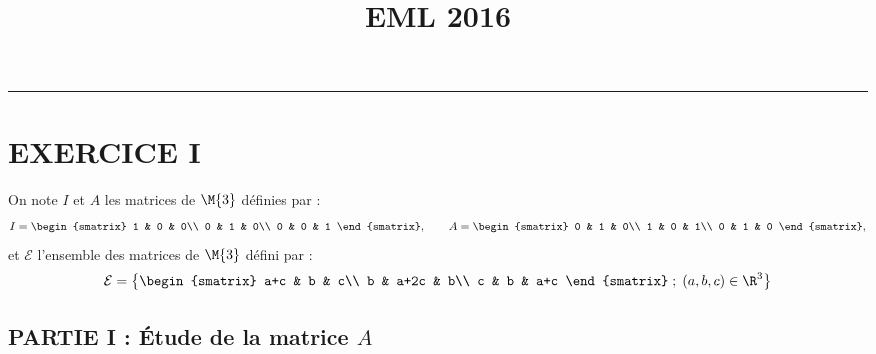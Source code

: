 \documentclass[11pt]{article}%
\title{\bf \vspace{-1.6cm} EML 2016} %
\author{} %
\date{} %
\begin{document}
\maketitle %
\vspace{-1.2cm}\hrule %
\thispagestyle{fancy}

\vspace*{.4cm}


\section*{EXERCICE I}

\noindent
On note $I$ et $A$ les matrices de $\M{3}$ définies 
par :
\[
I=
\begin{smatrix}
 1 & 0 & 0\\
 0 & 1 & 0\\
 0 & 0 & 1
\end{smatrix}
, \qquad 
A=
\begin{smatrix}
 0 & 1 & 0\\
 1 & 0 & 1\\
 0 & 1 & 0
\end{smatrix},
\]
et $\mathcal{E}$ l'ensemble des matrices de $\M{3}$ 
défini par :
\[
\mathcal{E}=\left\{
\begin{smatrix}
 a+c & b & c\\
 b & a+2c & b\\
 c & b & a+c
\end{smatrix} \; ; \; (a,b,c) \in \R^3 \right\}
\]

\subsection*{PARTIE I : Étude de la matrice $A$}
\end{document}
